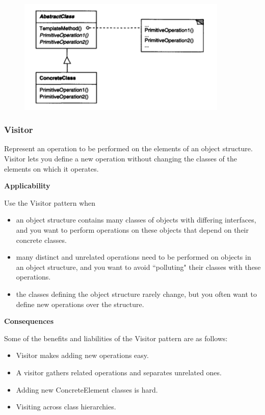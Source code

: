 \documentclass{article}
\begin{document}
\begin{figure}[h]
    \centering
    \includegraphics[width=10cm]{diagrams/pattern-22-template.png}
\end{figure}


\newpage
\subsubsection{Visitor}
Represent an operation to be performed on the elements of an object structure. Visitor lets you define a new operation without changing the classes of the elements on which it operates.

\textbf{Applicability}

Use the Visitor pattern when

\begin{itemize}
    \item an object structure contains many classes of objects with differing interfaces, and you want to perform operations on these objects that depend on their concrete classes.
    \item  many distinct and unrelated operations need to be performed on objects in an object structure, and you want to avoid ``polluting" their classes with these operations.
    \item the classes defining the object structure rarely change, but you often want to define new operations over the structure.
\end{itemize}

\textbf{Consequences}

Some of the benefits and liabilities of the Visitor pattern are as follows:
\begin{itemize}
    \item Visitor makes adding new operations easy.
    \item A visitor gathers related operations and separates unrelated ones.
    \item Adding new ConcreteElement classes is hard.
    \item Visiting across class hierarchies.
\end{itemize}
\end{document}
